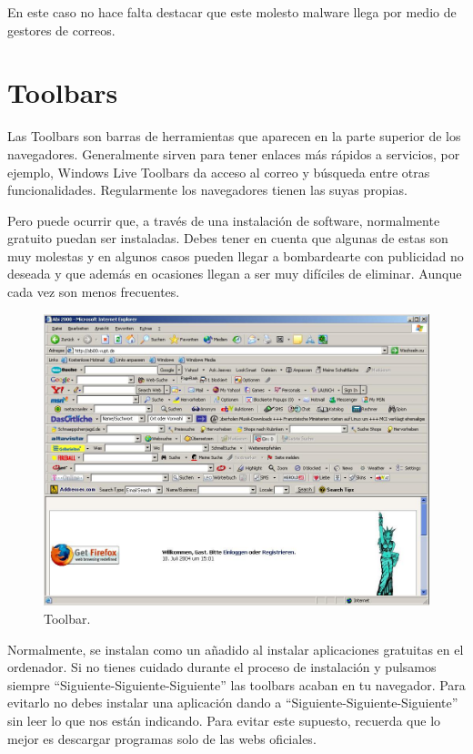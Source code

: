 \documentclass[
  a4paper,
  openany]{book}
\begin{document}
En este caso no hace falta destacar que este molesto malware llega por medio de gestores de correos.

\hypertarget{toolbars}{%
\section{Toolbars}\label{toolbars}}

Las Toolbars son barras de herramientas que aparecen en la parte superior de los navegadores. Generalmente sirven para tener enlaces más rápidos a servicios, por ejemplo, Windows Live Toolbars da acceso al correo y búsqueda entre otras funcionalidades. Regularmente los navegadores tienen las suyas propias.

Pero puede ocurrir que, a través de una instalación de software, normalmente gratuito puedan ser instaladas. Debes tener en cuenta que algunas de estas son muy molestas y en algunos casos pueden llegar a bombardearte con publicidad no deseada y que además en ocasiones llegan a ser muy difíciles de eliminar. Aunque cada vez son menos frecuentes.

\begin{figure}

{\centering \includegraphics[width=0.75\linewidth]{images/toolbar} 

}

\caption{Toolbar.}\label{fig:unnamed-chunk-20}
\end{figure}

Normalmente, se instalan como un añadido al instalar aplicaciones gratuitas en el ordenador. Si no tienes cuidado durante el proceso de instalación y pulsamos siempre ``Siguiente-Siguiente-Siguiente'' las toolbars acaban en tu navegador. Para evitarlo no debes instalar una aplicación dando a ``Siguiente-Siguiente-Siguiente'' sin leer lo que nos están indicando. Para evitar este supuesto, recuerda que lo mejor es descargar programas solo de las webs oficiales.
\end{document}
